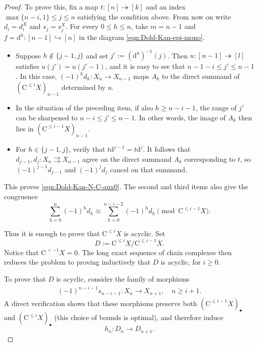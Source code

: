 \begin{proof}
	To prove this, fix a map $t:[n]\twoheadrightarrow[k]$ and an index
	$\max\{n-i,1\}\leq j\leq n$ satisfying the condition above. From now on
	write $d_i=d_i^X$ and $s_j=s_j^X$. For every $0\leq h\leq n$, take
	$m=n-1$ and $f=\mathrm{d}^h:[n-1]\hookrightarrow[n]$ in the diagram
	\eqref{eqn:Dold-Kan-epi-mono}.
	\begin{itemize}
		\item Suppose $h\notin\{j-1,j\}$ and set
		$j':=(\mathrm{d}^h)^{-1}(j)$. Then
		$u:[n-1]\twoheadrightarrow[l]$ satisfies $u(j')=u(j'-1)$, and it is
		easy to see that $n-1-i\leq j'\leq n-1$. In this case,
		$(-1)^hd_h:X_n\to X_{n-1}$ maps $A_k$ to the direct summand of
		$(\mathrm{C}^{\leq i}X)_{n-1}$ determined by $u$.
		\item In the situation of the preceding item, if also
		$h\geq n-i-1$, the range of $j'$ can be sharpened to
		$n-i\leq j'\leq n-1$. In other words, the image of $A_k$ then lies
		in $(\mathrm{C}^{\leq i-1}X)_{n-1}$.
		\item For $h\in\{j-1,j\}$, verify that
		$t\mathrm{d}^{j-1}=t\mathrm{d}^j$. It follows that
		$d_{j-1},d_j:X_n\rightrightarrows X_{n-1}$ agree on the direct
		summand $A_k$ corresponding to $t$, so $(-1)^{j-1}d_{j-1}$ and
		$(-1)^jd_j$ cancel on that summand.
	\end{itemize}
	This proves \eqref{eqn:Dold-Kan-N-C-aux0}. The second and third items also
	give the congruence
	\begin{equation}\label{eqn:Dold-Kan-N-C-aux}
		\sum_{h=0}^n (-1)^h d_h \equiv \sum_{h=0}^{n-i-2} (-1)^h d_h \pmod{ \mathrm{C}^{\leq i-1} X }.
	\end{equation}

	Thus it is enough to prove that $\mathrm{C}^{\leq i}X$ is acyclic. Set
	\[ D:=\mathrm{C}^{\leq i}X/\mathrm{C}^{\leq i-1}X. \]
	Notice that $\mathrm{C}^{<-1}X=0$. The long exact sequence of chain
	complexes then reduces the problem to proving inductively that $D$ is
	acyclic, for $i\geq0$.

	To prove that $D$ is acyclic, consider the family of morphisms
	\begin{gather*}
		(-1)^{n-i-1}s_{n-i-1}:X_n\to X_{n+1}, \quad n\geq i+1.
	\end{gather*}
	A direct verification shows that these morphisms preserve both
	$(\mathrm{C}^{\leq i-1}X)_\bullet$ and
	$(\mathrm{C}^{\leq i}X)_\bullet$ (this choice of bounds is optimal), and
	therefore induce
	\[ h_n:D_n\to D_{n+1}. \]


\end{proof}
